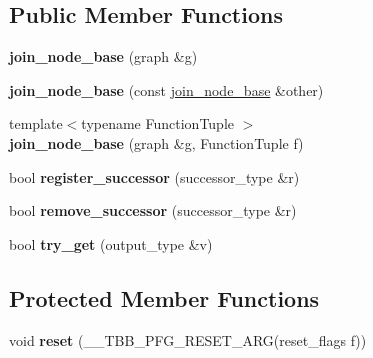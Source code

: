 \subsection*{Public Member Functions}
\begin{DoxyCompactItemize}
\item 
\hypertarget{classinternal_1_1join__node__base_ac9c4d8758fb2dda3f10885c59685f579}{}{\bfseries join\+\_\+node\+\_\+base} (graph \&g)\label{classinternal_1_1join__node__base_ac9c4d8758fb2dda3f10885c59685f579}

\item 
\hypertarget{classinternal_1_1join__node__base_a3e9f46aed8b67c564de2bbdd3ef1a02f}{}{\bfseries join\+\_\+node\+\_\+base} (const \hyperlink{classinternal_1_1join__node__base}{join\+\_\+node\+\_\+base} \&other)\label{classinternal_1_1join__node__base_a3e9f46aed8b67c564de2bbdd3ef1a02f}

\item 
\hypertarget{classinternal_1_1join__node__base_a56c76c779bacd3cdb6e8f8f401aeb36e}{}{\footnotesize template$<$typename Function\+Tuple $>$ }\\{\bfseries join\+\_\+node\+\_\+base} (graph \&g, Function\+Tuple f)\label{classinternal_1_1join__node__base_a56c76c779bacd3cdb6e8f8f401aeb36e}

\item 
\hypertarget{classinternal_1_1join__node__base_a9d8077d9b3159f013aa1ad3644f04ba5}{}bool {\bfseries register\+\_\+successor} (successor\+\_\+type \&r)\label{classinternal_1_1join__node__base_a9d8077d9b3159f013aa1ad3644f04ba5}

\item 
\hypertarget{classinternal_1_1join__node__base_a2f3a578539a4adc57cbd968c7158da5d}{}bool {\bfseries remove\+\_\+successor} (successor\+\_\+type \&r)\label{classinternal_1_1join__node__base_a2f3a578539a4adc57cbd968c7158da5d}

\item 
\hypertarget{classinternal_1_1join__node__base_ae6e98332ef9f5707e9e28fb4701792c7}{}bool {\bfseries try\+\_\+get} (output\+\_\+type \&v)\label{classinternal_1_1join__node__base_ae6e98332ef9f5707e9e28fb4701792c7}

\end{DoxyCompactItemize}
\subsection*{Protected Member Functions}
\begin{DoxyCompactItemize}
\item 
\hypertarget{classinternal_1_1join__node__base_a1734e7beffd1dc8aab762a74127a17bd}{}void {\bfseries reset} (\+\_\+\+\_\+\+T\+B\+B\+\_\+\+P\+F\+G\+\_\+\+R\+E\+S\+E\+T\+\_\+\+A\+R\+G(reset\+\_\+flags f))\label{classinternal_1_1join__node__base_a1734e7beffd1dc8aab762a74127a17bd}

\end{DoxyCompactItemize}

